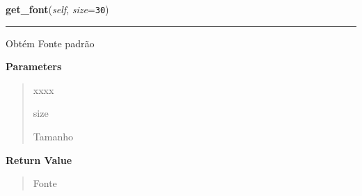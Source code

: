     \vspace{0.5ex}

\hspace{.8\funcindent}\begin{boxedminipage}{\funcwidth}

    \raggedright \textbf{get\_font}(\textit{self}, \textit{size}={\tt 30})

    \vspace{-1.5ex}

    \rule{\textwidth}{0.5\fboxrule}
\setlength{\parskip}{2ex}
    Obtém Fonte padrão

\setlength{\parskip}{1ex}
      \textbf{Parameters}
      \vspace{-1ex}

      \begin{quote}
        \begin{Ventry}{xxxx}

          \item[size]

          Tamanho

        \end{Ventry}

      \end{quote}

      \textbf{Return Value}
    \vspace{-1ex}

      \begin{quote}
      Fonte

      \end{quote}

    \end{boxedminipage}

    \label{pygame-asteroids:resource_manager:ResourceManager:get_font_by_name}

    \vspace{0.5ex}

